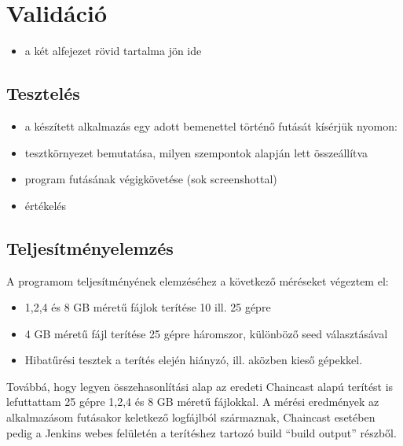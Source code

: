 \chapter{Validáció}
\label{chp:validation}
\begin{itemize}
  \item a két alfejezet rövid tartalma jön ide
\end{itemize}

\section{Tesztelés}
\begin{itemize}
  \item a készített alkalmazás egy adott bemenettel történő futását kísérjük nyomon:
  \item tesztkörnyezet bemutatása, milyen szempontok alapján lett összeállítva
  \item program futásának végigkövetése (sok screenshottal)
  \item értékelés
\end{itemize}

\section{Teljesítményelemzés}
A programom teljesítményének elemzéséhez a következő méréseket végeztem el:

\begin{itemize}
  \item 1,2,4 és 8 GB méretű fájlok terítése 10 ill. 25 gépre
  \item 4 GB méretű fájl terítése 25 gépre háromszor, különböző seed választásával
  \item Hibatűrési tesztek a terítés elején hiányzó, ill. aközben kieső gépekkel.
\end{itemize}

Továbbá, hogy legyen összehasonlítási alap  az eredeti Chaincast alapú terítést is lefuttattam 25 gépre 1,2,4 és 8 GB méretű fájlokkal.
A mérési eredmények az alkalmazásom futásakor keletkező logfájlból származnak, Chaincast esetében pedig a Jenkins webes felületén a terítéshez tartozó build ``build output'' részből.

